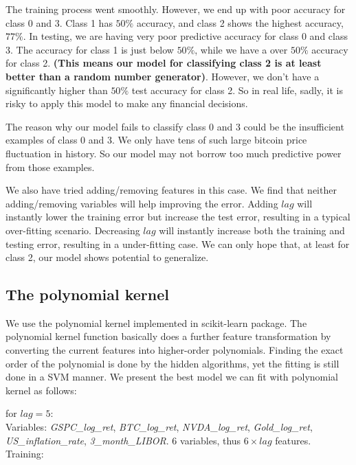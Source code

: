 \documentclass[9pt,twocolumn,twoside]{ilcss}
\begin{document}
The training process went smoothly. However, we end up with poor accuracy for class 0 and 3. Class 1 has $50\%$ accuracy, and class 2 shows the highest accuracy, $77\%$. In testing, we are having very poor predictive accuracy for class 0 and class 3. The accuracy for class 1 is just below $50\%$, while we have a over $50\%$ accuracy for class 2. \textbf{(This means our model for classifying class 2 is at least better than a random number generator)}. However, we don't have a significantly higher than $50\%$ test accuracy for class 2. So in real life, sadly, it is risky to apply this model to make any financial decisions.

The reason why our model fails to classify class 0 and 3 could be the insufficient examples of class 0 and 3. We only have tens of such large bitcoin price fluctuation in history. So our model may not borrow too much predictive power from those examples.

We also have tried adding/removing features in this case. We find that neither adding/removing variables will help improving the error. Adding $lag$ will instantly lower the training error but increase the test error, resulting in a typical over-fitting scenario. Decreasing $lag$ will instantly increase both the training and testing error, resulting in a under-fitting case. We can only hope that, at least for class 2, our model shows potential to generalize.

\subsection*{The polynomial kernel}
We use the polynomial kernel implemented in scikit-learn package. The polynomial kernel function basically does a further feature transformation by converting the current features into higher-order polynomials. Finding the exact order of the polynomial is done by the hidden algorithms, yet the fitting is still done in a SVM manner. We present the best model we can fit with polynomial kernel as follows:

\noindent  for $lag = 5$:
\smallskip\\
Variables: \textit{GSPC\_log\_ret}, \textit{BTC\_log\_ret}, \textit{NVDA\_log\_ret}, \textit{Gold\_log\_ret}, \textit{US\_inflation\_rate}, \textit{3\_month\_LIBOR}. 6 variables, thus $6\times lag$ features.
\smallskip\\
Training:
\end{document}
